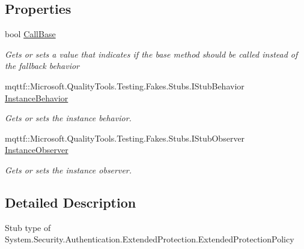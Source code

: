 \subsection*{Properties}
\begin{DoxyCompactItemize}
\item 
bool \hyperlink{class_system_1_1_security_1_1_authentication_1_1_extended_protection_1_1_fakes_1_1_stub_extended_protection_policy_afa525c7e7b13213e01ef6091e7ce929a}{Call\-Base}
\begin{DoxyCompactList}\small\item\em Gets or sets a value that indicates if the base method should be called instead of the fallback behavior\end{DoxyCompactList}\item 
mqttf\-::\-Microsoft.\-Quality\-Tools.\-Testing.\-Fakes.\-Stubs.\-I\-Stub\-Behavior \hyperlink{class_system_1_1_security_1_1_authentication_1_1_extended_protection_1_1_fakes_1_1_stub_extended_protection_policy_a4a34ee659be50452f9058a195ab2ac14}{Instance\-Behavior}
\begin{DoxyCompactList}\small\item\em Gets or sets the instance behavior.\end{DoxyCompactList}\item 
mqttf\-::\-Microsoft.\-Quality\-Tools.\-Testing.\-Fakes.\-Stubs.\-I\-Stub\-Observer \hyperlink{class_system_1_1_security_1_1_authentication_1_1_extended_protection_1_1_fakes_1_1_stub_extended_protection_policy_a9df1266a4cbad44bc3d1f3e41e3ff606}{Instance\-Observer}
\begin{DoxyCompactList}\small\item\em Gets or sets the instance observer.\end{DoxyCompactList}\end{DoxyCompactItemize}


\subsection{Detailed Description}
Stub type of System.\-Security.\-Authentication.\-Extended\-Protection.\-Extended\-Protection\-Policy



